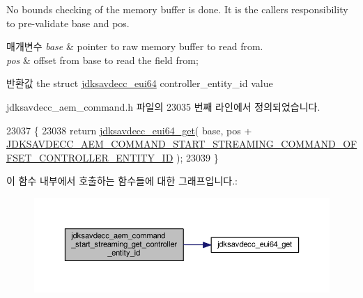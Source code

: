 No bounds checking of the memory buffer is done. It is the caller\textquotesingle{}s responsibility to pre-\/validate base and pos.


\begin{DoxyParams}{매개변수}
{\em base} & pointer to raw memory buffer to read from. \\
\hline
{\em pos} & offset from base to read the field from; \\
\hline
\end{DoxyParams}
\begin{DoxyReturn}{반환값}
the struct \hyperlink{structjdksavdecc__eui64}{jdksavdecc\+\_\+eui64} controller\+\_\+entity\+\_\+id value 
\end{DoxyReturn}


jdksavdecc\+\_\+aem\+\_\+command.\+h 파일의 23035 번째 라인에서 정의되었습니다.


\begin{DoxyCode}
23037 \{
23038     \textcolor{keywordflow}{return} \hyperlink{group__eui64_ga2652311a25a6b91cddbed75c108c7031}{jdksavdecc\_eui64\_get}( base, pos + 
      \hyperlink{group__command__start__streaming_gadd781d8ba95be11f9273257b9d49dec5}{JDKSAVDECC\_AEM\_COMMAND\_START\_STREAMING\_COMMAND\_OFFSET\_CONTROLLER\_ENTITY\_ID}
       );
23039 \}
\end{DoxyCode}


이 함수 내부에서 호출하는 함수들에 대한 그래프입니다.\+:
\nopagebreak
\begin{figure}[H]
\begin{center}
\leavevmode
\includegraphics[width=350pt]{group__command__start__streaming_ga61671a36c1527d1e4a6ef849d1b894c7_cgraph}
\end{center}
\end{figure}


